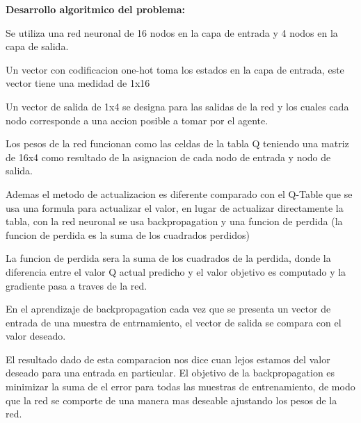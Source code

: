\textbf{Desarrollo algoritmico del problema: }

Se utiliza una red neuronal de 16 nodos en la capa de entrada y 4 nodos en la capa de salida.

Un vector con codificacion one-hot toma los estados en la capa de entrada, este vector tiene una medidad de 1x16

Un vector de salida de 1x4 se designa para las salidas de la red y los cuales cada nodo corresponde a una accion posible a tomar por el agente.

Los pesos de la red funcionan como las celdas de la tabla Q teniendo una matriz de 16x4 como resultado de la asignacion de cada nodo de entrada y nodo de salida.

Ademas el metodo de actualizacion es diferente comparado con el Q-Table que se usa una formula para actualizar el valor, en lugar de actualizar directamente la tabla, con la red neuronal se usa backpropagation y una funcion de perdida (la funcion de perdida es la suma de los cuadrados perdidos)

La funcion de perdida sera la suma de los cuadrados de la perdida, donde la diferencia entre el valor Q actual predicho y el valor objetivo es computado y la gradiente pasa a traves de la red.

En el aprendizaje de backpropagation cada vez que se presenta un vector de entrada de una muestra de entrnamiento, el vector de salida se compara con el valor deseado.

El resultado dado de esta comparacion nos dice cuan lejos estamos del valor deseado para una entrada en particular. El objetivo de la backpropagation es minimizar la suma de el error para todas las muestras de entrenamiento, de modo que la red se comporte de una manera mas deseable ajustando los pesos de la red.

